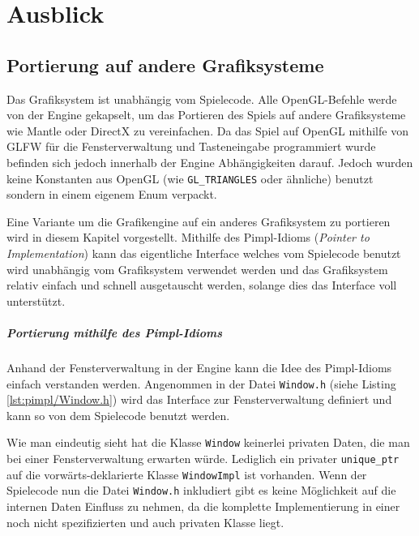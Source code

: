 \documentclass[12pt, a4paper, titlepage, hidelinks]{scrreprt}
\begin{document}
\chapter{Ausblick}
\section{Portierung auf andere Grafiksysteme}

Das Grafiksystem ist unabhängig vom Spielecode. Alle OpenGL-Befehle werde von der Engine gekapselt, um das Portieren des Spiels auf andere Grafiksysteme wie Mantle oder DirectX zu vereinfachen. Da das Spiel auf OpenGL mithilfe von GLFW für die Fensterverwaltung und Tasteneingabe programmiert wurde befinden sich jedoch innerhalb der Engine Abhängigkeiten darauf. Jedoch wurden keine Konstanten aus OpenGL (wie \texttt{GL\_TRIANGLES} oder ähnliche) benutzt sondern in einem eigenem Enum verpackt.


Eine Variante um die Grafikengine auf ein anderes Grafiksystem zu portieren wird in diesem Kapitel vorgestellt. Mithilfe des Pimpl-Idioms (\textit{Pointer to Implementation}) kann das eigentliche Interface welches vom Spielecode benutzt wird unabhängig vom Grafiksystem verwendet werden und das Grafiksystem relativ einfach und schnell ausgetauscht werden, solange dies das Interface voll unterstützt. 

\paragraph{Portierung mithilfe des Pimpl-Idioms}
Anhand der Fensterverwaltung in der Engine kann die Idee des Pimpl-Idioms einfach verstanden werden. Angenommen in der Datei \texttt{Window.h} (siehe Listing \autoref{lst:pimpl/Window.h}) wird das Interface zur Fensterverwaltung definiert und kann so von dem Spielecode benutzt werden.


Wie man eindeutig sieht hat die Klasse \texttt{Window} keinerlei privaten Daten, die man bei einer Fensterverwaltung erwarten würde. Lediglich ein privater \texttt{unique\_ptr} auf die vorwärts-deklarierte Klasse \texttt{WindowImpl} ist vorhanden. Wenn der Spielecode nun die Datei \texttt{Window.h} inkludiert gibt es keine Möglichkeit auf die internen Daten Einfluss zu nehmen, da die komplette Implementierung in einer noch nicht spezifizierten und auch privaten Klasse liegt.
\end{document}

